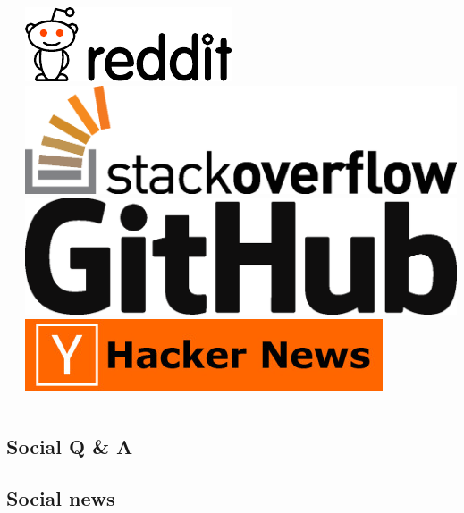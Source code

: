 \documentclass{beamer}
\begin{document}
\begin{frame}
\begin{columns}[T]
\begin{column}{.5\textwidth}
    \end{column}
    \begin{column}{.5\textwidth}
      \includegraphics[width=\textwidth]{Reddit_logo.pdf}\\
      \includegraphics[width=\textwidth]{so-logo.eps}\\
      \includegraphics[width=\textwidth]{GitHub_Logo.eps}\\
      \includegraphics[width=\textwidth]{hacker-news_logo.jpg}
    \end{column}
  \end{columns}
\end{frame}

\subsection{Social Q \&{} A}

\subsection{Social news}
\end{document}
